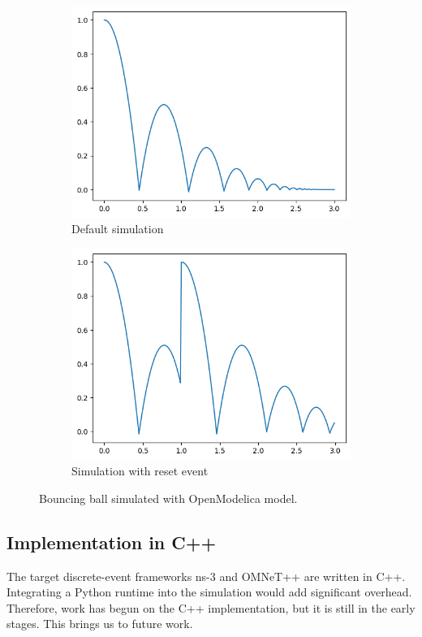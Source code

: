 \documentclass[conference]{IEEEtran}
\def\ns3{ns-3}
\begin{document}
\begin{figure}[htbp]
  \centering
  \begin{subfigure}[b]{\linewidth}
    \centering
    \includegraphics[width=0.5\linewidth]{images/openmodelica-fmu-default.png}
    \caption{Default simulation}
    \label{bb:openmodelica-fmu-default}
  \end{subfigure}
  
  \vspace{1em}
  
  \begin{subfigure}[b]{\linewidth}
    \centering
    \includegraphics[width=0.5\linewidth]{images/openmodelica-fmu-with-event.png}
    \caption{Simulation with reset event}
    \label{bb:openmodelica-fmu-with-event}
  \end{subfigure}
  
  \caption{Bouncing ball simulated with OpenModelica model.}
  \label{capacitor-discharge}
\end{figure}

\subsection{Implementation in C++}

The target discrete-event frameworks \ns3 and OMNeT++ are written in C++.
Integrating  a Python runtime into the simulation would add significant overhead.
Therefore, work has begun on the C++ implementation, but it is still in the early stages. This brings us to future work.
\end{document}
